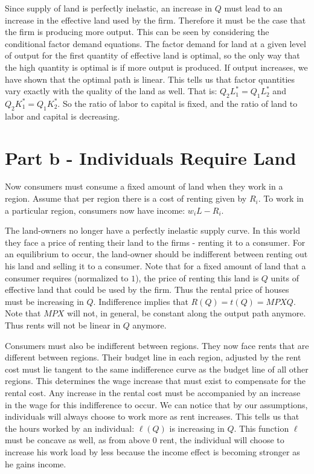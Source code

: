 \documentclass[12pt]{paper}
\begin{document}
Since supply of land is perfectly inelastic, an increase in $Q$ must
lead to an increase in the effective land used by the firm. Therefore
it must be the case that the firm is producing more output. This can
be seen by considering the conditional factor demand equations. The
factor demand for land at a given level of output for the first
quantity of effective land is optimal, so the only way that the high
quantity is optimal is if more output is produced. If output
increases, we have shown that the optimal path is linear. This tells
us that factor quantities vary exactly with the quality of the land as
well. That is: $Q_2L_1^{*} = Q_1L_2^{*}$ and
$Q_2 K_1^{*} = Q_1 K_2^{*}$. So the ratio of labor to capital is
fixed, and the ratio of land to labor and capital is decreasing.

\section*{Part b - Individuals Require Land}

Now consumers must consume a fixed amount of land when they work in a
region. Assume that per region there is a cost of renting given by
$R_i$. To work in a particular region, consumers now have income: $w_i
L - R_i$.

The land-owners no longer have a perfectly inelastic supply curve.  In
this world they face a price of renting their land to the firms -
renting it to a consumer. For an equilibrium to occur, the land-owner
should be indifferent between renting out his land and selling it to a
consumer. Note that for a fixed amount of land that a consumer
requires (normalized to $1$), the price of renting this land is $Q$
units of effective land that could be used by the firm. Thus the
rental price of houses must be increasing in $Q$. Indifference implies
that $R(Q) = t(Q) = MPX Q$. Note that $MPX$ will not, in general, be
constant along the output path anymore. Thus rents will not be linear
in $Q$ anymore.

Consumers must also be indifferent between regions. They now face
rents that are different between regions. Their budget line in each region,
adjusted by the rent cost must lie tangent to the same indifference
curve as the budget line of all other regions. This determines the
wage increase that must exist to compensate for the rental cost. Any
increase in the rental cost must be accompanied by an increase in the
wage for this indifference to occur. We can notice that by our
assumptions, individuals will always choose to work more as rent
increases. This tells us that the hours worked by an individual:
$\ell(Q)$ is increasing in $Q$. This function $\ell$ must be concave as
well, as from above $0$ rent, the individual will choose to increase
his work load by less because the income effect is becoming stronger
as he gains income.
\end{document}
